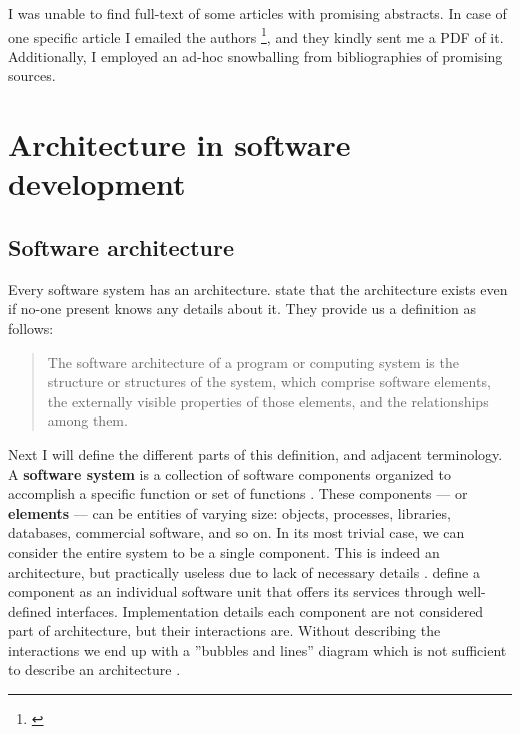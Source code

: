 \documentclass[utf8,english]{gradu3}
\begin{document}
I was unable to find full-text of some articles with promising abstracts.
In case of one specific article I emailed the authors
\footnote{\textcite{Bogner2018}}, and they kindly sent me a PDF of it.
Additionally, I employed an ad-hoc snowballing from bibliographies of promising
sources.

\section{Architecture in software development}

\subsection{Software architecture}

Every software system has an architecture. \textcite[23]{Bass1998} state that
the architecture exists even if no-one present knows any details about it. They
provide us a definition as follows:

\begin{quote}
  The software architecture of a program or computing system is the structure or
  structures of the system, which comprise software elements, the externally
  visible properties of those elements, and the relationships among them.
\end{quote}

Next I will define the different parts of this definition, and adjacent terminology. A \textbf{software
  system} is a collection of software components organized to
accomplish a specific function or set of functions \parencite[3]{IEEE42010}.
These components --- or \textbf{elements} --- can be entities of varying size: objects,
processes, libraries, databases, commercial software, and so on. In its most
trivial case, we can consider the entire system to be a single component. This
is indeed an architecture, but practically useless due to lack of necessary
details \parencite[24]{Bass1998}. \textcite[53]{Koskimies2005} define a component as an individual
software unit that offers its services through well-defined interfaces.
Implementation details each component are not considered part of
architecture, but their interactions are. Without describing the interactions we
end up with a ''bubbles and lines'' diagram which is not sufficient to describe
an architecture \parencite[24]{Bass1998}.
\end{document}
